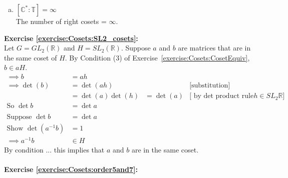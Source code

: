 \begin{enumerate}[(a)]
\item
$[ {\mathbb C}^\ast : {\mathbb T} ] = \infty$
\\
The number of right cosets = $\infty$.

\end{enumerate}

\noindent\textbf{Exercise \ref{exercise:Cosets:SL2_cosets}:}
\\
Let $G = GL_2({\mathbb R})$  and $H = SL_2({\mathbb R})$. Suppose $a$ and $b$ are matrices that are in the same coset of $H$.  By Condition (3) of Exercise~\ref{exercise:Cosets:CosetEquiv}, $b \in aH$. 
\begin{align*}
\implies b &= ah
\\
\implies \det(b) &= \det(ah)  & &\text{[substitution]}
\\
&= \det(a)\det(h) &= \det(a)  &\text{[ by det product rule and\ } h \in SL_2{\mathbb R} ]
\\
\text{So\ } \det b &= \det a
\\
\\
\text{Suppose\ } \det b &= \det a
\\
\text{Show\ } \det(a^{-1} b) &= 1
\\
\implies a^{-1}b &\in H
\end{align*}
By condition ... this implies that $a$ and $b$ are in the same coset.
\\
\\
\noindent\textbf{Exercise \ref{exercise:Cosets:order5and7}:}
%
